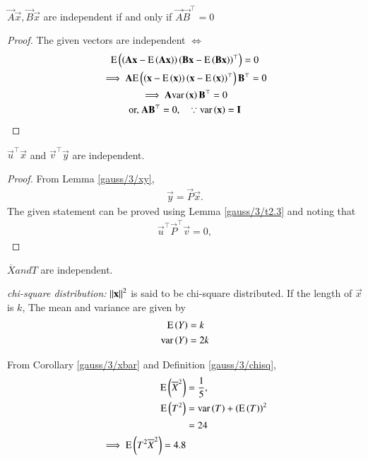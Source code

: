     \begin{lemma}
        \label{gauss/3/t2.3}    
        $\vec{A}\vec{x}, \vec{B}\vec{x}$ are  independent  if and only if $\vec{A}\vec{B}^{\top}=0$
        \end{lemma}
        \begin{proof}
        The given vectors are independent $\iff$ 
        \begin{multline}
            \text{E}\left( \left(\mathbf{A}\mathbf{x}-\text{E}\left( \mathbf{A}\mathbf{x} \right)\right)\left(\mathbf{B}\mathbf{x}-\text{E}\left( \mathbf{B}\mathbf{x} \right)\right)^{\top} \right) = 0\\
             \implies \mathbf{A}\text{E}\left( \left(\mathbf{x}-\text{E}\left( \mathbf{x} \right)\right)\left(\mathbf{x}-\text{E}\left( \mathbf{x} \right)\right)^{\top} \right)\mathbf{B}^{\top} = 0\\
             \implies \mathbf{A}\text{var}\left( \mathbf{x} \right)\mathbf{B}^{\top} = 0\\
             \text{or, } \mathbf{A}\mathbf{B}^{\top} = 0, \quad \because \text{var}\left( \mathbf{x} \right) = \mathbf{I}
        \end{multline}        
        \end{proof}
\begin{theorem}    
    $\vec{u}^{\top}\vec{x}$ and $\vec{v}^{\top}\vec{y}$ are independent.
\end{theorem}
\begin{proof}
    From Lemma     \ref{gauss/3/xy}, 
    \begin{align}
        \vec{y} = \vec{P}\vec{x}. 
    \end{align}        
The given statement can be proved  using Lemma         \ref{gauss/3/t2.3} and noting that      
    \begin{align}
        \vec{u}^{\top}\vec{P}^{\top} \vec{v}=0, 
    \end{align}            
\end{proof}
\begin{corollary}    
    $\overline{X} and T$ are independent.
\end{corollary}
\begin{definition}
    \label{gauss/3/chisq}
    {\em chi-square distribution: } $\left\lVert\mathbf{x}\right\rVert^2$ is said to be chi-square distributed.  If the length of $\vec{x}$ is $k$,
 The mean and variance are given by
 \begin{align}
   \text{E}\left( Y \right)&=k\\
   \text{var}\left( Y \right)&=2k
 \end{align}
\end{definition}
From       Corollary  \ref{gauss/3/xbar} and      Definition \ref{gauss/3/chisq},
\begin{align}
    \text{E}\left( \overline{X}^2 \right) &= \frac{1}{5}, 
    \\
    \text{E}\left( T^2 \right) &=  \text{var}\left( T \right)+\left(\text{E}\left( T \right)\right)^2\\
    &=24
    \\
    \implies  \text{E}\left( T^2\overline{X}^2 \right)=4.8
\end{align}